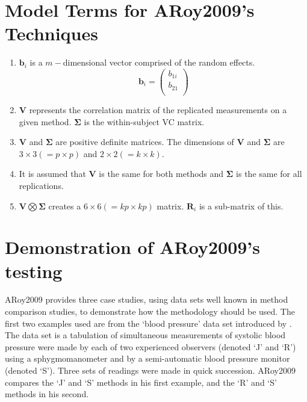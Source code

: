 \documentclass[12pt, a4paper]{report}
\theoremstyle{plain}
\theoremstyle{definition}
\theoremstyle{remark}
\begin{document}
	
	\section{Model Terms for ARoy2009's Techniques}
	\begin{enumerate}
		\item $\boldsymbol{b}_{i}$ is a $m-$dimensional vector comprised of
		the random effects.
		\begin{equation}
		\boldsymbol{b}_{i} = \left( \begin{array}{c}
		b_{1i} \\
		b_{21}  \\
		\end{array}\right)
		\end{equation}
		
		\item $\boldsymbol{V}$ represents the correlation matrix of the replicated measurements on a given method.
		$\boldsymbol{\Sigma}$ is the within-subject VC matrix.
		
		\item $\boldsymbol{V}$ and $\boldsymbol{\Sigma}$ are positive
		definite matrices. The dimensions of $\boldsymbol{V}$ and
		$\boldsymbol{\Sigma}$ are $3 \times 3 ( = p \times p )$ and $ 2 \times
		2 (= k \times k)$.
		
		\item It is assumed that $\boldsymbol{V}$ is the same for both methods and $\boldsymbol{\Sigma}$ is
		the same for all replications.
		
		\item $\boldsymbol{V} \bigotimes \boldsymbol{\Sigma}$ creates a $ 6 \times 6 ( = kp \times
		kp)$ matrix.
		$\boldsymbol{R}_{i}$ is a sub-matrix of this.
	\end{enumerate}
	
	\section{Demonstration of ARoy2009's testing}
	ARoy2009 provides three case studies, using data sets well known in method comparison studies, to demonstrate how the methodology should be used. The first two examples used are from the `blood pressure' data set introduced by \citet{BA99}. The data set is a tabulation of simultaneous measurements of systolic blood pressure were made by each of two experienced observers (denoted `J' and `R') using a sphygmomanometer and by a semi-automatic blood pressure monitor (denoted `S'). Three sets of readings were made in quick succession. ARoy2009 compares the `J' and `S' methods in his first example, and the `R' and `S' methods in his second.
	
\end{document}
